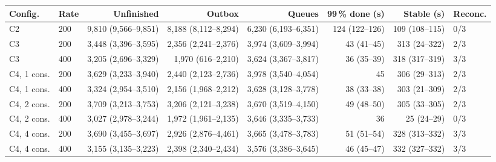 \begin{tabular}{llrrrrrl}
\toprule
Config. & Rate & Unfinished & Outbox & Queues & 99\,\% done (s) & Stable (s) & Reconc. \\
\midrule
C2 & 200 & 9,810 (9,566--9,851) & 8,188 (8,112--8,294) & 6,230 (6,193--6,351) & 124 (122--126) & 109 (108--115) & 0/3 \\
\addlinespace[2pt]
C3 & 200 & 3,448 (3,396--3,595) & 2,356 (2,241--2,376) & 3,974 (3,609--3,994) & 43 (41--45) & 313 (24--322) & 2/3 \\
C3 & 400 & 3,205 (2,696--3,329) & 1,970 (616--2,210) & 3,624 (3,367--3,817) & 36 (35--39) & 318 (317--319) & 3/3 \\
\addlinespace[2pt]
C4, 1 cons. & 200 & 3,629 (3,233--3,940) & 2,440 (2,123--2,736) & 3,978 (3,540--4,054) & 45 & 306 (29--313) & 2/3 \\
C4, 1 cons. & 400 & 3,324 (2,954--3,510) & 2,156 (1,968--2,212) & 3,628 (3,128--3,778) & 38 (33--38) & 303 (21--309) & 2/3 \\
\addlinespace[2pt]
C4, 2 cons. & 200 & 3,709 (3,213--3,753) & 3,206 (2,121--3,238) & 3,670 (3,519--4,150) & 49 (48--50) & 305 (33--305) & 2/3 \\
C4, 2 cons. & 400 & 3,027 (2,978--3,244) & 1,972 (1,961--2,135) & 3,646 (3,335--3,733) & 36 & 25 (24--29) & 0/3 \\
\addlinespace[2pt]
C4, 4 cons. & 200 & 3,690 (3,455--3,697) & 2,926 (2,876--4,461) & 3,665 (3,478--3,783) & 51 (51--54) & 328 (313--332) & 3/3 \\
C4, 4 cons. & 400 & 3,155 (3,135--3,223) & 2,398 (2,340--2,434) & 3,576 (3,386--3,645) & 46 (45--47) & 332 (327--332) & 3/3 \\
\bottomrule
\end{tabular}
